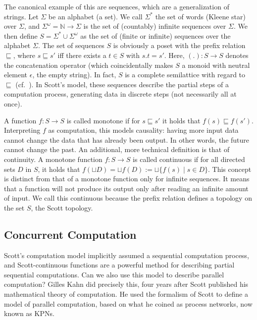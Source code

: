 The canonical example of this are sequences, which are a generalization of strings. Let $\Sigma$ be an alphabet (a set). 
We call $\Sigma^*$ the set of words (Kleene star) over $\Sigma$, and $\Sigma^\omega = \mathbb{N} \rightarrow \Sigma$ is the set of (countably) infinite sequences over $\Sigma$.
We then define $S = \Sigma^* \cup \Sigma^\omega$ as the set of (finite or infinite) sequences over the alphabet $\Sigma$.
The set of sequences $S$ is obviously a \ac{poset} with the prefix relation $\sqsubseteq$, where $s \sqsubseteq s'$ iff there exists a $t \in S$ with $s.t = s'$.
Here, $(.) : S \rightarrow S$ denotes the concatenation operator (which coincidentally makes $S$ a monoid with neutral element $\epsilon$, the empty string).
In fact, $S$ is a complete semilattice with regard to $\sqsubseteq$ (cf.~\cite{lee_matsikoudis_semantics}).
In Scott's model, these sequences describe the partial steps of a computation process, generating data in discrete steps (not necessarily all at once). 

A function $f : S \rightarrow S$ is called monotone if for $s \sqsubseteq s'$ it holds that $f(s) \sqsubseteq f(s')$.
Interpreting $f$ as computation, this models causality: having more input data cannot change the data that has already been output.
In other words, the future cannot change the past.
An additional, more technical definition is that of continuity.
A monotone function $f : S \rightarrow S$ is called continuous if for all directed sets $D$ in $S$, it holds that $f (\sqcup D) = \sqcup f(D) := \sqcup \{ f(s) \mid s \in D \}$.
This concept is distinct from that of a monotone function only for infinite sequences.
It means that a function will not produce its output only after reading an infinite amount of input.
We call this continuous because the prefix relation defines a topology on the set $S$, the Scott topology.

\subsection{Concurrent Computation}
\label{sec:concurrent_mocs}
Scott's computation model implicitly assumed a sequential computation process, and Scott-continuous functions are a powerful method for describing partial sequential computations.
Can we also use this model to describe parallel computation?
Gilles Kahn did precisely this, four years after Scott published his mathematical theory of computation. 
He used the formalism of Scott to define a model of parallel computation, based on what he coined as process networks, now known as \acfp{KPN}\cite{kahn74}.

